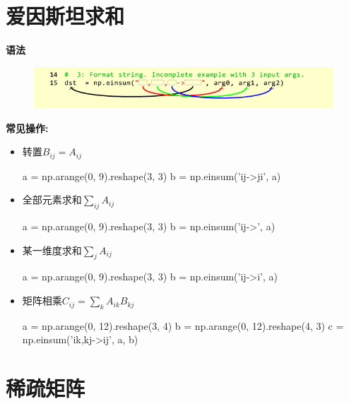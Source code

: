 \documentclass[12pt,a4paper]{article}
\begin{document}
	\section{爱因斯坦求和}
	\textbf{语法}
	\begin{figure}[H]
		\centering
		\includegraphics[width=0.7\linewidth]{figures/einsum}
		\caption{}
		\label{fig:einsum}
	\end{figure}
	\textbf{常见操作:}
	\begin{itemize}
		\item 转置$B_{ij} = A_{ij}$  
			\begin{python}
			a = np.arange(0, 9).reshape(3, 3)
			b = np.einsum('ij->ji', a)
			\end{python}		
		\item 全部元素求和$\sum\limits_{ij} A_{ij}$  
			\begin{python}
			a = np.arange(0, 9).reshape(3, 3)
			b = np.einsum('ij->', a)
			\end{python}
		\item 某一维度求和$\sum\limits_j A_{ij}$  
			\begin{python}
				a = np.arange(0, 9).reshape(3, 3)
				b = np.einsum('ij->i', a)
			\end{python}
		\item 矩阵相乘$C_{ij}=\sum\limits_{k}A_{ik}B_{kj}$
			\begin{python}
				a = np.arange(0, 12).reshape(3, 4)
				b = np.arange(0, 12).reshape(4, 3)
				c = np.einsum('ik,kj->ij', a, b)
			\end{python}
	\end{itemize}
	
	\section{稀疏矩阵}	
\end{document}
